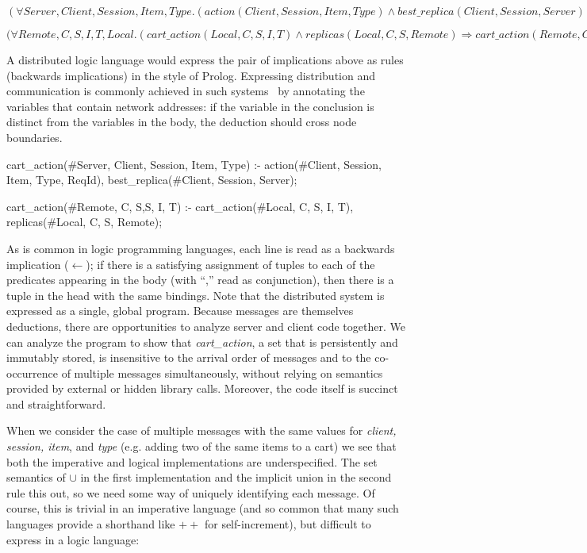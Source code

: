 $(\forall Server, Client, Session, Item, Type . ( action(Client, Session, Item, Type) 
\land best\_replica(Client, Session, Server) ) \Rightarrow cart\_action(Server, Client, Session, Item, Type)) $


$(\forall Remote, C, S, I, T, Local . (cart\_action(Local, C, S, I, T) \land
replicas(Local, C, S, Remote) \Rightarrow cart\_action(Remote, C, S, I, T))
$

A distributed logic language would express the pair of implications above as rules
(backwards implications) in the style of Prolog.  Expressing distribution and communication
is commonly achieved in such systems~\cite{Loo} by annotating the variables that 
contain network addresses: if the variable in the conclusion is distinct from the variables in
the body, the deduction should cross node boundaries.

\begin{Dedalus}
cart\_action(#Server, Client, Session, Item, Type) :-
  action(#Client, Session, Item, Type, ReqId),
  best_replica(#Client, Session, Server);

cart\_action(#Remote, C, S,S, I, T) :-
  cart\_action(#Local, C, S, I, T),
  replicas(#Local, C, S, Remote);
\end{Dedalus}

As is common in logic programming languages, each line is read as a backwards
implication ($\leftarrow$); if there is a satisfying assignment of tuples to each of
the predicates appearing in the body (with ``,'' read as conjunction), 
then there is a tuple in the head with the same bindings.
Note that the distributed system is expressed as a single, global program.
Because messages are themselves deductions, there are opportunities to 
analyze server and client code together.  We can analyze the program to 
show that {\em cart\_action}, a set that is persistently and immutably
stored, is insensitive to the arrival order of messages 
and to the co-occurrence of multiple messages simultaneously, without relying
on semantics provided by external or hidden library calls. Moreover, the code 
itself is succinct and straightforward. 




When we consider the case of multiple messages with the same values for
{\em client, session, item}, and {\em type} (e.g. adding two of the same items to a cart)
we see that both the imperative and logical implementations are underspecified.
The set semantics of $\cup$ in the first implementation and the implicit union 
in the second rule this out, so we need some way of uniquely identifying each message.
Of course, this is trivial in an imperative language (and so common that many such languages
provide a shorthand like $++$ for self-increment), but difficult to express in a logic language:

